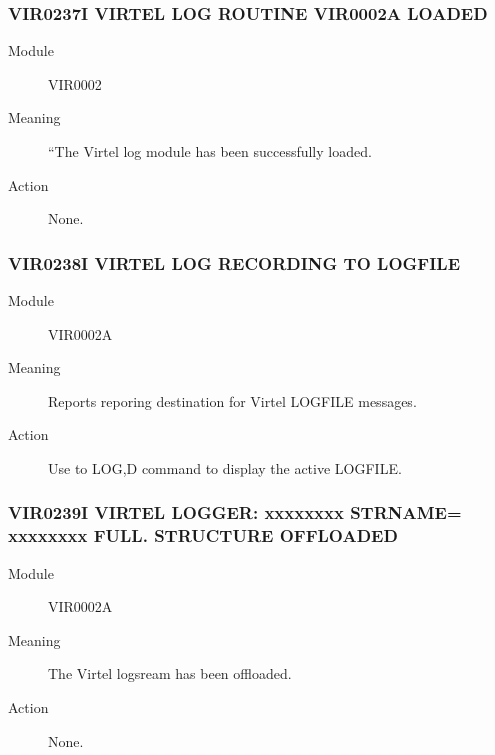 \documentclass[letterpaper,10pt,english]{sphinxmanual}
\begin{document}
\subsubsection{VIR0237I VIRTEL LOG ROUTINE VIR0002A LOADED}
\label{\detokenize{messages:vir0237i-virtel-log-routine-vir0002a-loaded}}\begin{description}
\item[{Module}] \leavevmode
VIR0002

\item[{Meaning}] \leavevmode
“The Virtel log module has been successfully loaded.

\item[{Action}] \leavevmode
None.

\end{description}


\subsubsection{VIR0238I VIRTEL LOG RECORDING TO LOGFILE}
\label{\detokenize{messages:vir0238i-virtel-log-recording-to-logfile}}\begin{description}
\item[{Module}] \leavevmode
VIR0002A

\item[{Meaning}] \leavevmode
Reports reporing destination for Virtel LOGFILE messages.

\item[{Action}] \leavevmode
Use to LOG,D command to display the active LOGFILE.

\end{description}


\subsubsection{VIR0239I VIRTEL LOGGER: xxxxxxxx STRNAME= xxxxxxxx FULL. STRUCTURE OFFLOADED}
\label{\detokenize{messages:vir0239i-virtel-logger-xxxxxxxx-strname-xxxxxxxx-full-structure-offloaded}}\begin{description}
\item[{Module}] \leavevmode
VIR0002A

\item[{Meaning}] \leavevmode
The Virtel logsream has been offloaded.

\item[{Action}] \leavevmode
None.

\end{description}
\end{document}
